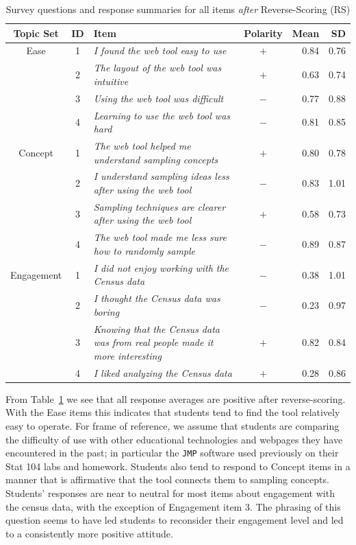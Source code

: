\documentclass[11pt]{isuthesis}\usepackage[]{graphicx}\usepackage[]{color}
\begin{document}
\begin{table}[hbtp]
\centering
\small
\begin{tabular}{ccp{3.4in}crr}
Topic Set & ID & Item & Polarity & Mean & SD\\[3pt]
  \hline
Ease & 1 & \it I found the web tool easy to use & $+$ & 0.84 & 0.76\\  
 & 2 & \it The layout of the web tool was intuitive & $+$  & 0.63 & 0.74\\  
 & 3 & \it Using the web tool was difficult & $-$  & 0.77& 0.88\\  
 & 4 & \it Learning to use the web tool was hard & $-$  & 0.81 & 0.85\\  [3pt]
  \hline
Concept & 1 & \it The web tool helped me understand sampling concepts & $+$  & 0.80& 0.78\\   
& 2 & \it I understand sampling ideas less after using the web tool & $-$  & 0.83& 1.01\\  
& 3 & \it Sampling techniques are clearer after using the web tool & $+$  & 0.58& 0.73\\  
& 4 & \it The web tool made me less sure how to randomly sample & $-$  & 0.89& 0.87\\  
   \hline
Engagement & 1 & \it I did not enjoy working with the Census data & $-$  & 0.38 & 1.01\\  
& 2 & \it I thought the Census data was boring & $-$   & 0.23& 0.97\\  
& 3 & \it Knowing that the Census data was from real people made it more interesting & $+$  & 0.82& 0.84\\   
& 4 & \it I liked analyzing the Census data & $+$  & 0.28 & 0.86\\   
\end{tabular}
\caption{Survey questions and response summaries for all items \textit{after} Reverse-Scoring (RS)}
\label{tab:surveyquestions}
\end{table}

\normalsize

From Table~\ref{tab:surveyquestions} we see that all response averages are positive after reverse-scoring. With the Ease items this indicates that students tend to find the tool relatively easy to operate. For frame of reference, we assume that students are comparing the difficulty of use with other educational technologies and webpages they have encountered in the past; in particular the \texttt{JMP} software used previously on their Stat 104 labs and homework. Students also tend to respond to Concept items in a manner that is affirmative that the tool connects them to sampling concepts. Students' responses are near to neutral for most items about engagement with the census data, with the exception of Engagement item 3.  The phrasing of this question seems to have led students to reconsider their engagement level and led to a consistently more positive attitude.
\end{document}
